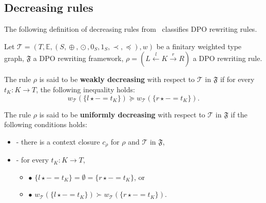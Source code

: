 \subsection{Decreasing rules}
\label{sec:decreasing_rules}
The following definition of decreasing rules from~\cite{endrullis2024generalized_arxiv_v2} classifies DPO rewriting rules.

\begin{definition}
    \label{wf:def:decreasing_rule}
    Let $\mathcal{T} \mathop{=} (T,\mathbb{E}, (S, \mathop{\oplus}, \mathop{\odot}, 0_S, 1_S, \prec, \mathop{\preceq}),w)$ be a finitary weighted type graph, \(\mathfrak{F}\) a DPO rewriting framework, $\rho \mathop{=} (L \overset{l}{\leftarrow} K \overset{r}{\rightarrow} R)$ a DPO rewriting rule.

    \noindent
    The rule $\rho$ is said to be \textbf{weakly decreasing} with respect to $\mathcal{T}$ in $\mathfrak{F}$ if 
            for every $t_K : K \mathop{\to} T$, the following inequality holds:
                $$ 
                  w_\mathcal{T}(\{l \mathop{\star} - \mathop{=} t_K\}) \mathop{\succeq} w_\mathcal{T}(\{r\star - \mathop{=} t_K\}).$$
           
    \noindent
    The rule $\rho$ is said to be \textbf{uniformly decreasing} with respect to $\mathcal{T}$ in $\mathfrak{F}$ if the following conditions holds:
        \begin{itemize}
            \item[]- there is a context closure $c_\rho$ for $\rho$ and $\mathcal{T}$ in $\mathfrak{F}$, 
            \item[]- for every $t_K : K \mathop{\to} T$,
            \begin{itemize}
                \item[] $\bullet$ $\{l \mathop{\star} - \mathop{=} t_K\} \mathop{=} \emptyset \mathop{=} \{r \mathop{\star} - \mathop{=} t_K\}$, or
                \item[] $\bullet$ $w_\mathcal{T}(\{l \mathop{\star} - \mathop{=} t_K\}) 
                        \mathop{\succ}   w_\mathcal{T}(\{r \mathop{\star} - \mathop{=} t_K\}) $.
            \end{itemize}
        \end{itemize}  
         

\end{definition}
